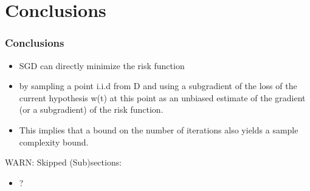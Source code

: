 \section{Conclusions}

\begin{frame}
\frametitle{Conclusions}

\begin{itemize}
    \item SGD can directly minimize the risk function
    \item by sampling a point i.i.d from D and using a subgradient of the loss of the
        current hypothesis w(t) at this point as an unbiased estimate of the gradient (or
        a subgradient) of the risk function.
    \item This implies that a bound on the number of iterations also yields a sample complexity bound.
\end{itemize}

WARN: Skipped (Sub)sections:\\
\begin{itemize}
    \item ?
\end{itemize}

\end{frame}

